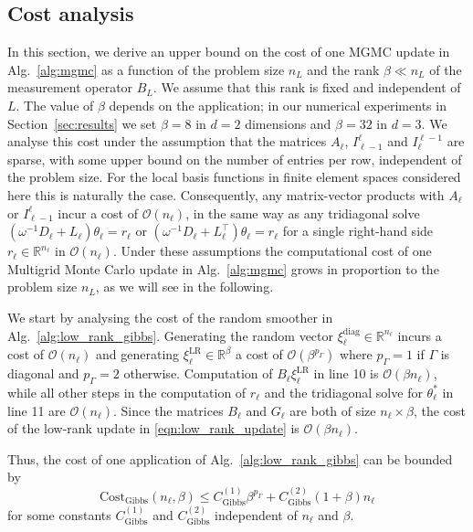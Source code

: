 \documentclass[11pt,english]{article}
\theoremstyle{plain}
\theoremstyle{plain}
\theoremstyle{plain}
\theoremstyle{plain}
\numberwithin{equation}{section}
\newcommand{\rev}[1]{#1}
\begin{document}
\subsection{Cost analysis\label{subsec:Cost-analysis}}
In this section, we derive an upper bound on the cost of one MGMC update in Alg.~\ref{alg:mgmc} as a function of the problem size $n_L$ and the rank $\beta\ll n_L$ of the measurement operator $B_L$. \rev{We assume that this rank is fixed and independent of $L$. The value of $\beta$ depends on the application; in our numerical experiments in Section~\ref{sec:results} we set $\beta=8$ in $d=2$ dimensions and $\beta=32$ in $d=3$.} We analyse this cost under the assumption that the matrices $A_\ell$, $I_{\ell-1}^{\ell}$ and $I_{\ell}^{\ell-1}$ are sparse, with some upper bound on the number of entries per row, independent of the problem size. For the local basis functions in finite element spaces considered here this is naturally the case. Consequently, any matrix-vector products with $A_\ell$
or $I_{\ell-1}^{\ell}$ incur a cost of $\mathcal{O}(n_\ell)$, in the same way as any tridiagonal solve $(\omega^{-1}D_\ell+L_\ell)\theta_\ell=r_\ell$ or $(\omega^{-1}D_\ell+L_\ell^\top)\theta_\ell=r_\ell$ for a single right-hand side $r_\ell\in\mathbb{R}^{n_\ell}$ in $\mathcal{O}(n_\ell)$.
Under these assumptions the computational cost of one Multigrid Monte Carlo update in Alg.~\ref{alg:mgmc} grows in proportion to the problem size $n_L$, as we will see in the following.

We start by analysing the cost of the random smoother in Alg.~\ref{alg:low_rank_gibbs}.
Generating the random vector $\xi_\ell^{\mathrm{diag}}\in\mathbb{R}^{n_\ell}$ incurs a cost of $\mathcal{O}(n_\ell)$ and generating $\xi_\ell^{\mathrm{LR}}\in\mathbb{R}^{\beta}$ a cost of $\mathcal{O}(\beta^{p_\Gamma})$ where $p_\Gamma=1$ if $\Gamma$ is diagonal and $p_\Gamma=2$ otherwise. Computation of $B_{\ell}\xi_\ell^{\text{LR}}$ in line 10 is $\mathcal{O}(\beta n_\ell)$, while all other steps in the computation of $r_\ell$ and the tridiagonal solve for $\theta_\ell^*$ in line 11 are $\mathcal{O}(n_\ell)$. Since the matrices $B_{\ell}$ and $G_{\ell}$ are both of size $n_\ell\times\beta$, the cost of the low-rank update in \eqref{eqn:low_rank_update} is $\mathcal{O}(\beta n_\ell)$.

Thus, the cost of one application of Alg.~\ref{alg:low_rank_gibbs} can be bounded by
\begin{equation}
    \mathrm{Cost}_{\mathrm{Gibbs}}(n_\ell,\beta) \le C_{\mathrm{Gibbs}}^{(1)} \beta^{p_\Gamma} + C_{\mathrm{Gibbs}}^{(2)} (1+\beta) n_\ell\label{eqn:smoother_cost}
\end{equation}
for some constants $C_{\mathrm{Gibbs}}^{(1)}$ and $C_{\mathrm{Gibbs}}^{(2)}$ independent of $n_\ell$ and $\beta$.
\end{document}
